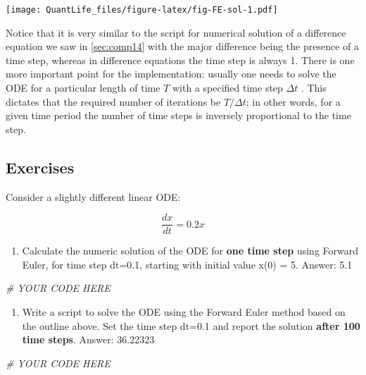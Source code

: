 \documentclass[
]{book}
\newenvironment{Shaded}{\begin{snugshade}}{\end{snugshade}}
\newcommand{\CommentTok}[1]{\textcolor[rgb]{0.56,0.35,0.01}{\textit{#1}}}
\providecommand{\tightlist}{%
  \setlength{\itemsep}{0pt}\setlength{\parskip}{0pt}}
\theoremstyle{definition}
\theoremstyle{definition}
\theoremstyle{definition}
\theoremstyle{remark}
\begin{document}
\texttt{[image: QuantLife\_files/figure-latex/fig-FE-sol-1.pdf]}

Notice that it is very similar to the script for numerical solution of a difference equation we saw in \ref{sec:comp14} with the major difference being the presence of a time step, whereas in difference equations the time step is always 1. There is one more important point for the implementation: usually one needs to solve the ODE for a particular length of time \(T\) with a specified time step \(\Delta t\) . This dictates that the required number of iterations be \(T/\Delta t\); in other words, for a given time period the number of time steps is inversely proportional to the time step.

\hypertarget{exercises-17}{%
\subsection{Exercises}\label{exercises-17}}

Consider a slightly different linear ODE:

\[
\frac{dx}{dt} =  0.2 x 
\]

\begin{enumerate}
\def\labelenumi{\arabic{enumi}.}
\tightlist
\item
  Calculate the numeric solution of the ODE for \textbf{one time step} using Forward Euler, for time step dt=0.1, starting with initial value x(0) = 5. Answer: 5.1
\end{enumerate}

\begin{Shaded}
\begin{Highlighting}[]
\CommentTok{\# YOUR CODE HERE}
\end{Highlighting}
\end{Shaded}

\begin{enumerate}
\def\labelenumi{\arabic{enumi}.}
\setcounter{enumi}{1}
\tightlist
\item
  Write a script to solve the ODE using the Forward Euler method based on the outline above. Set the time step dt=0.1 and report the solution \textbf{after 100 time steps}. Answer: 36.22323
\end{enumerate}

\begin{Shaded}
\begin{Highlighting}[]
\CommentTok{\# YOUR CODE HERE}
\end{Highlighting}
\end{Shaded}
\end{document}
